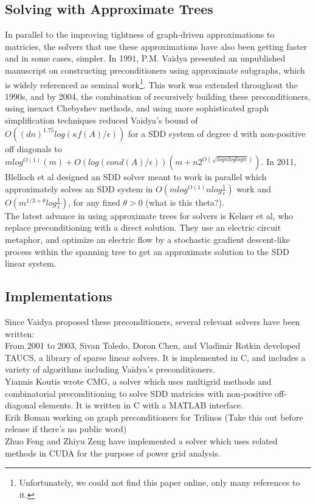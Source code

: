\documentclass{article}
\begin{document}
\subsection*{Solving with Approximate Trees}
In parallel to the improving tightness of graph-driven approximations to matricies, the solvers that use these approximations have also been getting faster and in some cases, simpler.
In 1991, P.M. Vaidya presented an unpublished manuscript\cite{vaidya} on constructing preconditioners using approximate subgraphs, which is widely referenced as seminal work\footnote{Unfortunately, we could not find this paper online, only many references to it.}.  This work was extended throughout the 1990s, and by 2004, the combination of recursively building these preconditioners, using inexact Chebyshev methods, and using more sophisticated graph simplification techniques reduced Vaidya's bound of $O((dn)^{1.75}log(κf(A)/\epsilon))$ for a SDD system of degree d with non-positive off diagonals to $mlog^{O(1)}(m)+O(log(cond(A)/\epsilon))(m+n2^{O(\sqrt{lognlog logn})})$\cite{nearly-linear-sparse}.
In 2011, Blelloch et al designed an SDD solver meant to work in parallel which approximately solves an SDD system in 
$O(mlog^{O(1)}nlog\frac{1}{\epsilon})$ work and $O(m^{1/3 + \theta}log\frac{1}{\epsilon})$, for any fixed $\theta>0$ (what is this theta?).\\


The latest advance in using approximate trees for solvers is Kelner et al\cite{comb-sdd}, who replace preconditioning with a direct solution.  They use an electric circuit metaphor, and optimize an electric flow by a stochastic gradient descent-like process within the spanning tree to get an approximate solution to the SDD linear system.  

\subsection*{Implementations}
Since Vaidya proposed these preconditioners, several relevant solvers have been written:\\
From 2001 to 2003, Sivan Toledo, Doron Chen, and Vladimir Rotkin developed TAUCS\cite{taucs}, a library of sparse linear solvers. 
It is implemented in C, and includes a variety of algorithms including Vaidya's preconditioners.\\
Yiannis Koutis wrote CMG\cite{CMG}, a solver which uses multigrid methods and combinatorial preconditioning to solve SDD matricies with non-positive off-diagonal elements.  It is written in C with a MATLAB interface.\\
Erik Boman working on graph preconditioners for Trilinos (Take this out before release if there's no public word)\\
Zhuo Feng and Zhiyu Zeng have implemented a solver which uses related methods in CUDA for the purpose of power grid analysis.\\
\end{document}
